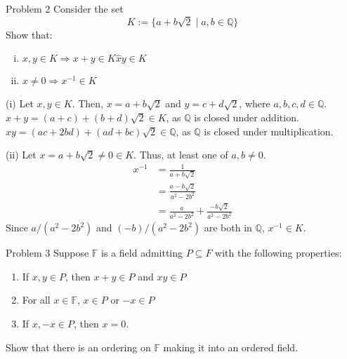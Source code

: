 \documentclass[10pt]{extarticle}
\newcommand{\Q}{\mathbb{Q}}
\begin{document}
  \begin{problem}{Problem 2}
    Consider the set
    \[
      K:= \{a + b\sqrt{2} \mid a,b\in\Q\}
    \] 
    Show that:
    \begin{enumerate}[(i)]
      \item $x,y\in K \Rightarrow x+y\in K \hat xy\in K$
      \item $x\neq 0 \Rightarrow x^{-1}\in K$
    \end{enumerate}
    \tcblower
    \begin{problem}{(i)}
      Let $x,y\in K$. Then, $x = a+b\sqrt{2}$ and $y = c+d\sqrt{2}$, where $a,b,c,d\in \Q$.\\

      $x+y = (a+c) + (b+d)\sqrt{2}\in K$, as $\Q$ is closed under addition.\\

      $xy = (ac + 2bd) + (ad + bc)\sqrt{2}\in\Q$, as $\Q$ is closed under multiplication.
    \end{problem}
    \begin{problem}{(ii)}
      Let $x=a+b\sqrt{2}\neq 0\in K$. Thus, at least one of $a,b\neq 0$.
      \begin{align*}
        x^{-1} &= \frac{1}{a+b\sqrt{2}}\\
               &= \frac{a-b\sqrt{2}}{a^2-2b^2}\\
               &= \frac{a}{a^2-2b^2} + \frac{-b\sqrt{2}}{a^2-2b^2}
      \end{align*}
      Since $a/(a^2 - 2b^2)$ and $(-b)/(a^2-2b^2)$ are both in $\Q$, $x^{-1}\in K$.
    \end{problem}
  \end{problem}
  \begin{problem}{Problem 3}
    Suppose $\mathbb{F}$ is a field admitting $P\subseteq F$ with the following properties:
    \begin{enumerate}[(C1)]
      \item If $x,y\in P$, then $x+y\in P$ and $xy\in P$
      \item For all $x\in \mathbb{F}$, $x\in P$ or $-x\in P$
      \item If $x,-x\in P$, then $x = 0$.
    \end{enumerate}
    Show that there is an ordering on $\mathbb{F}$ making it into an ordered field.
  \end{problem}
\end{document}
